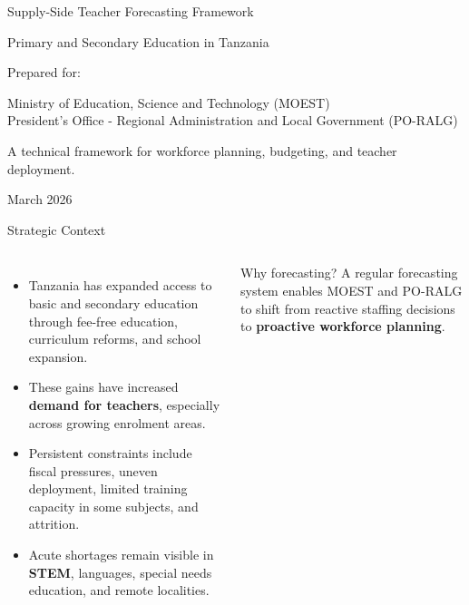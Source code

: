 \documentclass[
  11pt,
  ignorenonframetext,
  aspectratio=169,
  11pt]{beamer}
\author{}
\date{}
\newcommand{\highlight}[1]{\textcolor{DavidsonBlueDark}{\textbf{#1}}}
\newcommand{\gold}[1]{\textcolor{AccentGold}{\textbf{#1}}}
\begin{document}
\begin{frame}[plain]
  \vspace{0.9cm}
  {\color{white}Supply-Side Teacher Forecasting Framework\par}
  \vspace{0.2cm}
  {\color{white!92}Primary and Secondary Education in Tanzania\par}
  \vspace{0.7cm}
  {\color{white}\large Prepared for: \par}
  \vspace{0.15cm}
  {\color{white!92}\normalsize Ministry of Education, Science and Technology (MOEST)\\
  President's Office - Regional Administration and Local Government (PO-RALG)\par}
  \vfill
  {\color{white!85}\small A technical framework for workforce planning, budgeting, and teacher deployment.\par}
  \vspace{0.35cm}
    {\color{white!80}\small March 2026\par}
\end{frame}

\begin{frame}{Strategic Context}
\begin{columns}[T,onlytextwidth]
\begin{itemize}
  \item Tanzania has expanded access to basic and secondary education through fee-free education, curriculum reforms, and school expansion.
  \item These gains have increased \highlight{demand for teachers}, especially across growing enrolment areas.
  \item Persistent constraints include fiscal pressures, uneven deployment, limited training capacity in some subjects, and attrition.
  \item Acute shortages remain visible in \gold{STEM}, languages, special needs education, and remote localities.
\end{itemize}
\begin{block}{Why forecasting?}
\justifying
A regular forecasting system enables MOEST and PO-RALG to shift from reactive staffing decisions to \highlight{proactive workforce planning}.
\end{block}
\end{columns}
\end{frame}
\end{document}
